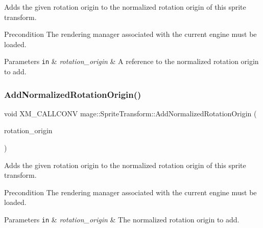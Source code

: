 Adds the given rotation origin to the normalized rotation origin of this sprite transform.

\begin{DoxyPrecond}{Precondition}
The rendering manager associated with the current engine must be loaded. 
\end{DoxyPrecond}

\begin{DoxyParams}[1]{Parameters}
\mbox{\tt in}  & {\em rotation\+\_\+origin} & A reference to the normalized rotation origin to add. \\
\hline
\end{DoxyParams}
\hypertarget{structmage_1_1_sprite_transform_a5571cc3e5700aba23f8c229675f10c3e}{}\label{structmage_1_1_sprite_transform_a5571cc3e5700aba23f8c229675f10c3e} 
\subsubsection{\texorpdfstring{Add\+Normalized\+Rotation\+Origin()}{AddNormalizedRotationOrigin()}\hspace{0.1cm}{\footnotesize\ttfamily [3/3]}}
{\footnotesize\ttfamily void X\+M\+\_\+\+C\+A\+L\+L\+C\+O\+NV mage\+::\+Sprite\+Transform\+::\+Add\+Normalized\+Rotation\+Origin (\begin{DoxyParamCaption}\item[{F\+X\+M\+V\+E\+C\+T\+OR}]{rotation\+\_\+origin }\end{DoxyParamCaption})}

Adds the given rotation origin to the normalized rotation origin of this sprite transform.

\begin{DoxyPrecond}{Precondition}
The rendering manager associated with the current engine must be loaded. 
\end{DoxyPrecond}

\begin{DoxyParams}[1]{Parameters}
\mbox{\tt in}  & {\em rotation\+\_\+origin} & The normalized rotation origin to add. \\
\hline
\end{DoxyParams}
\hypertarget{structmage_1_1_sprite_transform_a005c488bb8601f0defe11b3496a4a838}{}\label{structmage_1_1_sprite_transform_a005c488bb8601f0defe11b3496a4a838} 
